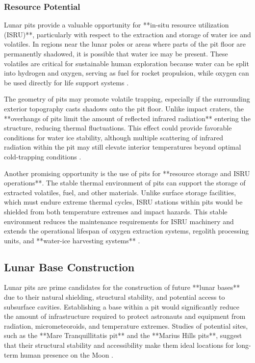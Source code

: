 \subsubsection{Resource Potential}

Lunar pits provide a valuable opportunity for **in-situ resource utilization (ISRU)**, particularly with respect to the extraction and storage of water ice and volatiles. In regions near the lunar poles or areas where parts of the pit floor are permanently shadowed, it is possible that water ice may be present. These volatiles are critical for sustainable human exploration because water can be split into hydrogen and oxygen, serving as fuel for rocket propulsion, while oxygen can be used directly for life support systems \cite{jsanders-isru}.

The geometry of pits may promote volatile trapping, especially if the surrounding exterior topography casts shadows onto the pit floor. Unlike impact craters, the **overhangs of pits limit the amount of reflected infrared radiation** entering the structure, reducing thermal fluctuations. This effect could provide favorable conditions for water ice stability, although multiple scattering of infrared radiation within the pit may still elevate interior temperatures beyond optimal cold-trapping conditions \cite{newer-thermal}.

Another promising opportunity is the use of pits for **resource storage and ISRU operations**. The stable thermal environment of pits can support the storage of extracted volatiles, fuel, and other materials. Unlike surface storage facilities, which must endure extreme thermal cycles, ISRU stations within pits would be shielded from both temperature extremes and impact hazards. This stable environment reduces the maintenance requirements for ISRU machinery and extends the operational lifespan of oxygen extraction systems, regolith processing units, and **water-ice harvesting systems** \cite{jsanders-isru, thermal-lunar-pits}.

\subsection{Lunar Base Construction}

Lunar pits are prime candidates for the construction of future **lunar bases** due to their natural shielding, structural stability, and potential access to subsurface cavities. Establishing a base within a pit would significantly reduce the amount of infrastructure required to protect astronauts and equipment from radiation, micrometeoroids, and temperature extremes. Studies of potential sites, such as the **Mare Tranquillitatis pit** and the **Marius Hills pits**, suggest that their structural stability and accessibility make them ideal locations for long-term human presence on the Moon \cite{new-wagner, Carrer2024}.


